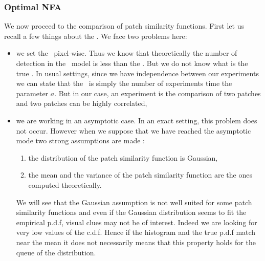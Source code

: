
\subsubsection{Optimal NFA}
\label{sec:optimal_nfa}
We now proceed to the comparison of patch similarity functions.
First let us recall a few things about the \NFA. 
We face two problems here:
\begin{itemize}
\item we set the \NFA \ pixel-wise. Thus we know that theoretically the number of detection in the \acontrario \ model is 
  less than the \NFA . But we do not know what is the true \NFA . In usual settings, since we have independence between
  our experiments we can state that the \NFA \ is simply the number of experiments time the parameter $a$. But in our case,
  an experiment is the comparison of two patches and two patches can be highly correlated,
\item we are working in an asymptotic case. In an exact setting, this problem does not occur. However when we suppose that
  we have reached the asymptotic mode two strong assumptions are made :
  \begin{enumerate}
  \item the distribution of the patch similarity function is Gaussian,
    \item the mean and the variance of the patch similarity function are the ones computed theoretically.
      \end{enumerate}
      We will see that the Gaussian assumption is not well suited for some patch similarity functions and even if the Gaussian
      distribution seems to fit the empirical p.d.f, visual clues may not be of interest. Indeed we are looking for very low
      values of the c.d.f. Hence if the histogram and the true p.d.f match near the mean it does not necessarily means that this
      property holds for the queue of the distribution.
    \end{itemize}


